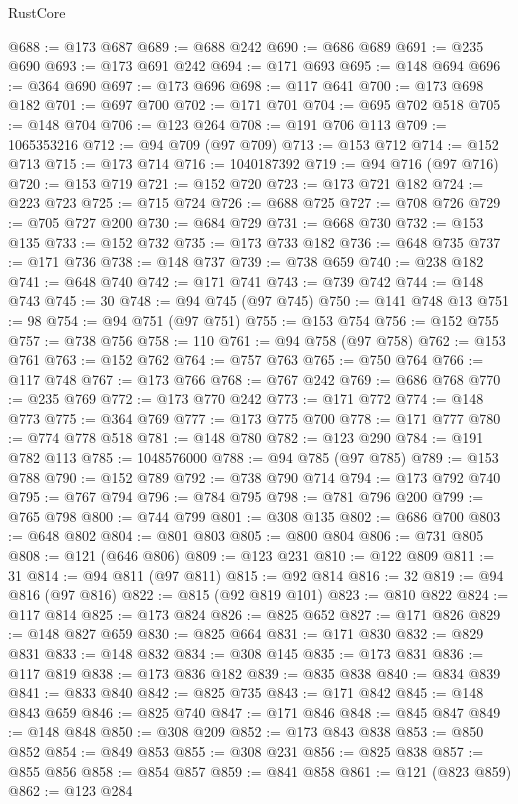 \begin{lexlean}{RustCore}
\begin{coremodule}
@688 := @173 @687
@689 := @688 @242
@690 := @686 @689
@691 := @235 @690
@693 := @173 @691 @242
@694 := @171 @693
@695 := @148 @694
@696 := @364 @690
@697 := @173 @696
@698 := @117 @641
@700 := @173 @698 @182
@701 := @697 @700
@702 := @171 @701
@704 := @695 @702 @518
@705 := @148 @704
@706 := @123 @264
@708 := @191 @706 @113
@709 := 1065353216
@712 := @94 @709 (@97 @709)
@713 := @153 @712
@714 := @152 @713
@715 := @173 @714
@716 := 1040187392
@719 := @94 @716 (@97 @716)
@720 := @153 @719
@721 := @152 @720
@723 := @173 @721 @182
@724 := @223 @723
@725 := @715 @724
@726 := @688 @725
@727 := @708 @726
@729 := @705 @727 @200
@730 := @684 @729
@731 := @668 @730
@732 := @153 @135
@733 := @152 @732
@735 := @173 @733 @182
@736 := @648 @735
@737 := @171 @736
@738 := @148 @737
@739 := @738 @659
@740 := @238 @182
@741 := @648 @740
@742 := @171 @741
@743 := @739 @742
@744 := @148 @743
@745 := 30
@748 := @94 @745 (@97 @745)
@750 := @141 @748 @13
@751 := 98
@754 := @94 @751 (@97 @751)
@755 := @153 @754
@756 := @152 @755
@757 := @738 @756
@758 := 110
@761 := @94 @758 (@97 @758)
@762 := @153 @761
@763 := @152 @762
@764 := @757 @763
@765 := @750 @764
@766 := @117 @748
@767 := @173 @766
@768 := @767 @242
@769 := @686 @768
@770 := @235 @769
@772 := @173 @770 @242
@773 := @171 @772
@774 := @148 @773
@775 := @364 @769
@777 := @173 @775 @700
@778 := @171 @777
@780 := @774 @778 @518
@781 := @148 @780
@782 := @123 @290
@784 := @191 @782 @113
@785 := 1048576000
@788 := @94 @785 (@97 @785)
@789 := @153 @788
@790 := @152 @789
@792 := @738 @790 @714
@794 := @173 @792 @740
@795 := @767 @794
@796 := @784 @795
@798 := @781 @796 @200
@799 := @765 @798
@800 := @744 @799
@801 := @308 @135
@802 := @686 @700
@803 := @648 @802
@804 := @801 @803
@805 := @800 @804
@806 := @731 @805
@808 := @121 (@646 @806)
@809 := @123 @231
@810 := @122 @809
@811 := 31
@814 := @94 @811 (@97 @811)
@815 := @92 @814
@816 := 32
@819 := @94 @816 (@97 @816)
@822 := @815 (@92 @819 @101)
@823 := @810 @822
@824 := @117 @814
@825 := @173 @824
@826 := @825 @652
@827 := @171 @826
@829 := @148 @827 @659
@830 := @825 @664
@831 := @171 @830
@832 := @829 @831
@833 := @148 @832
@834 := @308 @145
@835 := @173 @831
@836 := @117 @819
@838 := @173 @836 @182
@839 := @835 @838
@840 := @834 @839
@841 := @833 @840
@842 := @825 @735
@843 := @171 @842
@845 := @148 @843 @659
@846 := @825 @740
@847 := @171 @846
@848 := @845 @847
@849 := @148 @848
@850 := @308 @209
@852 := @173 @843 @838
@853 := @850 @852
@854 := @849 @853
@855 := @308 @231
@856 := @825 @838
@857 := @855 @856
@858 := @854 @857
@859 := @841 @858
@861 := @121 (@823 @859)
@862 := @123 @284

\end{coremodule}
\end{lexlean}
